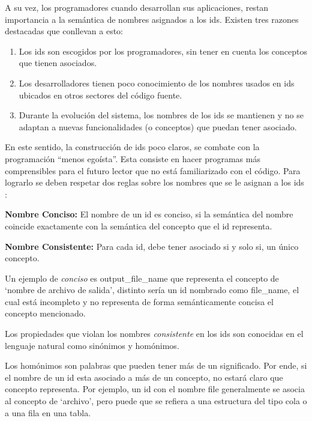 A su vez, los programadores cuando desarrollan sus aplicaciones, restan importancia a la semántica de nombres asignados a los ids. Existen tres razones destacadas que conllevan a esto:

\begin{enumerate}
\itemsep0em%
\item Los ids son escogidos por los programadores, sin tener en cuenta los conceptos que tienen asociados.

\item Los desarrolladores tienen poco conocimiento de los nombres usados en ids ubicados en otros sectores del código fuente.

\item Durante la evolución del sistema, los nombres de los ids se mantienen y no se adaptan a nuevas funcionalidades (o conceptos) que puedan tener asociado.
\end{enumerate}

En este sentido, la construcción de ids poco claros, se combate con la programación “menos egoísta”. Esta consiste en hacer programas más comprensibles para el futuro lector que no está familiarizado con el código. Para lograrlo se deben respetar dos reglas sobre los nombres que se le asignan a los ids \cite{DFPM05,DLHD06}:

\begin{framed}
\noindent \textbf{Nombre Conciso:} El nombre de un id es conciso, si la semántica del nombre coincide exactamente con la semántica del concepto que el id representa.

\noindent \textbf{Nombre Consistente:} Para cada id, debe tener asociado si y solo si, un único concepto.
\end{framed}

Un ejemplo de \textit{conciso} es \textsf{output\_file\_name} que representa el concepto de `nombre de archivo de salida', distinto sería un id nombrado como \textsf{file\_name}, el cual está incompleto y no representa de forma semánticamente concisa el concepto mencionado.

Los propiedades que violan los nombres \textit{consistente} en los ids son conocidas en el lenguaje natural como sinónimos y homónimos. 

Los homónimos son palabras que pueden tener más de un significado. Por ende, si el nombre de un id esta asociado a más de un concepto, no estará claro que concepto representa. Por ejemplo, un id con el nombre \textsf{file} generalmente se asocia al concepto de `archivo', pero puede que se refiera a una estructura del tipo cola o a una fila en una tabla.

